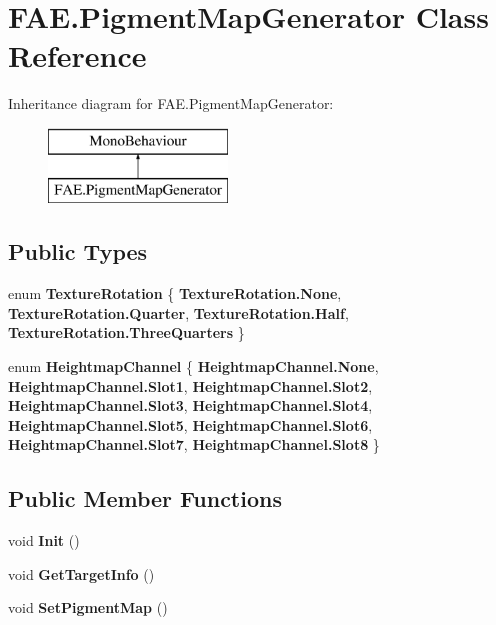 \section{F\+A\+E.\+Pigment\+Map\+Generator Class Reference}
\label{class_f_a_e_1_1_pigment_map_generator}
Inheritance diagram for F\+A\+E.\+Pigment\+Map\+Generator\+:\begin{figure}[H]
\begin{center}
\leavevmode
\includegraphics[height=2.000000cm]{class_f_a_e_1_1_pigment_map_generator}
\end{center}
\end{figure}
\subsection*{Public Types}
\begin{DoxyCompactItemize}
\item 
enum \textbf{ Texture\+Rotation} \{ \textbf{ Texture\+Rotation.\+None}, 
\textbf{ Texture\+Rotation.\+Quarter}, 
\textbf{ Texture\+Rotation.\+Half}, 
\textbf{ Texture\+Rotation.\+Three\+Quarters}
 \}
\item 
enum \textbf{ Heightmap\+Channel} \{ \newline
\textbf{ Heightmap\+Channel.\+None}, 
\textbf{ Heightmap\+Channel.\+Slot1}, 
\textbf{ Heightmap\+Channel.\+Slot2}, 
\textbf{ Heightmap\+Channel.\+Slot3}, 
\newline
\textbf{ Heightmap\+Channel.\+Slot4}, 
\textbf{ Heightmap\+Channel.\+Slot5}, 
\textbf{ Heightmap\+Channel.\+Slot6}, 
\textbf{ Heightmap\+Channel.\+Slot7}, 
\newline
\textbf{ Heightmap\+Channel.\+Slot8}
 \}
\end{DoxyCompactItemize}
\subsection*{Public Member Functions}
\begin{DoxyCompactItemize}
\item 
void \textbf{ Init} ()
\item 
void \textbf{ Get\+Target\+Info} ()
\item 
void \textbf{ Set\+Pigment\+Map} ()
\end{DoxyCompactItemize}
